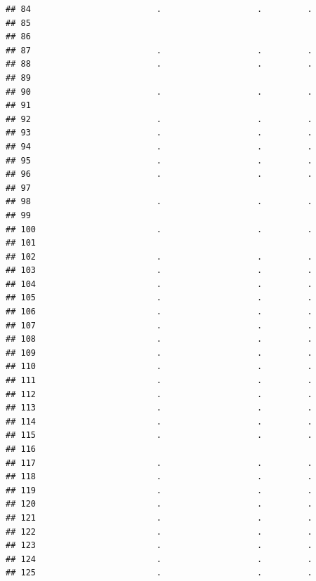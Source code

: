 \documentclass[
]{article}
\begin{document}
\begin{verbatim}
## 84                         .                   .         .
## 85                                                        
## 86                                                        
## 87                         .                   .         .
## 88                         .                   .         .
## 89                                                        
## 90                         .                   .         .
## 91                                                        
## 92                         .                   .         .
## 93                         .                   .         .
## 94                         .                   .         .
## 95                         .                   .         .
## 96                         .                   .         .
## 97                                                        
## 98                         .                   .         .
## 99                                                        
## 100                        .                   .         .
## 101                                                       
## 102                        .                   .         .
## 103                        .                   .         .
## 104                        .                   .         .
## 105                        .                   .         .
## 106                        .                   .         .
## 107                        .                   .         .
## 108                        .                   .         .
## 109                        .                   .         .
## 110                        .                   .         .
## 111                        .                   .         .
## 112                        .                   .         .
## 113                        .                   .         .
## 114                        .                   .         .
## 115                        .                   .         .
## 116                                                       
## 117                        .                   .         .
## 118                        .                   .         .
## 119                        .                   .         .
## 120                        .                   .         .
## 121                        .                   .         .
## 122                        .                   .         .
## 123                        .                   .         .
## 124                        .                   .         .
## 125                        .                   .         .

\end{verbatim}
\end{document}
